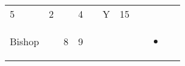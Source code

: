 \documentclass[12pt]{article}
\begin{document}
\begin{longtable}[]{@{}llllllllll@{}}
\begin{minipage}[t]{0.06\columnwidth}
5
\strut\end{minipage} &
\begin{minipage}[t]{0.06\columnwidth}\raggedright\strut
2
\strut\end{minipage} &
\begin{minipage}[t]{0.06\columnwidth}\raggedright\strut
\strut\end{minipage} &
\begin{minipage}[t]{0.06\columnwidth}\raggedright\strut
4
\strut\end{minipage} &
\begin{minipage}[t]{0.06\columnwidth}\raggedright\strut
\strut\end{minipage} &
\begin{minipage}[t]{0.07\columnwidth}\raggedright\strut
Y
\strut\end{minipage} &
\begin{minipage}[t]{0.08\columnwidth}\raggedright\strut
15
\strut\end{minipage}\tabularnewline
\begin{minipage}[t]{0.13\columnwidth}\raggedright\strut
Bishop
\strut\end{minipage} &
\begin{minipage}[t]{0.06\columnwidth}\raggedright\strut
\strut\end{minipage} &
\begin{minipage}[t]{0.06\columnwidth}\raggedright\strut
8
\strut\end{minipage} &
\begin{minipage}[t]{0.06\columnwidth}\raggedright\strut
9
\strut\end{minipage} &
\begin{minipage}[t]{0.06\columnwidth}\raggedright\strut
\strut\end{minipage} &
\begin{minipage}[t]{0.06\columnwidth}\raggedright\strut
\strut\end{minipage} &
\begin{minipage}[t]{0.06\columnwidth}\raggedright\strut
\strut\end{minipage} &
\begin{minipage}[t]{0.06\columnwidth}\raggedright\strut
\strut\end{minipage} &
\begin{minipage}[t]{0.07\columnwidth}\raggedright\strut
\begin{itemize}
\item
\end{itemize}
\strut\end{minipage} &

\end{longtable}
\end{document}
